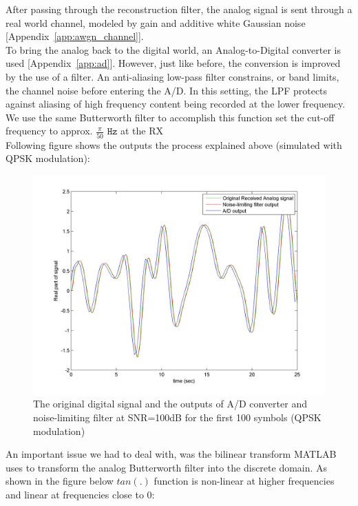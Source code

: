 \documentclass[]{article}
\begin{document}
After passing through the reconstruction filter, the analog signal is  sent through a real world channel, modeled by gain and additive white Gaussian noise [Appendix~\ref{app:awgn_channel}].\\


To bring the analog back to the digital world, an Analog-to-Digital converter is used [Appendix~\ref{app:ad}].  However, just like before, the conversion is improved by the use of a filter.  An anti-aliasing low-pass filter constrains, or band limits, the channel noise before entering the A/D.  In this setting, the LPF protects against aliasing of high frequency content being recorded at the lower frequency.  We use the same Butterworth filter to accomplish this function set the cut-off frequency to approx. $\frac{\pi}{50}$ $\mathtt{Hz}$ at the RX \\

\newpage
Following figure shows the outputs the process explained above (simulated with QPSK modulation):

\begin{figure}[H]
\centering
\includegraphics[width=\textwidth]{AtoD.jpg}
\caption{The original digital signal and the outputs of A/D converter and noise-limiting filter at SNR=100dB for the first 100 symbols (QPSK modulation) \label{fig:atod}}
\end{figure}

\newpage
An important issue we had to deal with, was the bilinear transform MATLAB uses to transform the analog Butterworth filter into the discrete domain. As shown in the figure below $tan(.)$ function is non-linear at higher frequencies and linear at frequencies close to 0:
\end{document}
